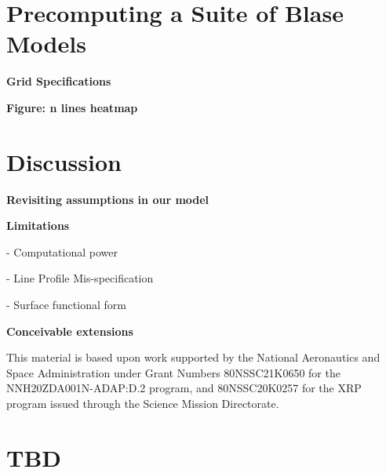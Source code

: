 \documentclass[twocolumn]{aastex631}
\begin{document}
\section{Precomputing a Suite of Blase Models}
\begin{mdframed}
    \textbf{Grid Specifications} \par
    \textcolor{lightgray}{\lipsum[5]}
\end{mdframed}

\begin{mdframed}
    \textbf{Figure: n lines heatmap} \par
\end{mdframed}

\section{Discussion}\label{sec:intro}
\begin{mdframed}
    \textbf{Revisiting assumptions in our model} \par
    \textcolor{lightgray}{\lipsum[5]}
\end{mdframed}

\begin{mdframed}
    \textbf{Limitations} \par
    - Computational power \par
    - Line Profile Mis-specification \par
    - Surface functional form \par
    \textcolor{lightgray}{\lipsum[14]}
\end{mdframed}


\begin{mdframed}
    \textbf{Conceivable extensions} \par
    \textcolor{lightgray}{\lipsum[16]}
\end{mdframed}


\pagebreak
\newpage

\begin{acknowledgments}
    This material is based upon work supported by the National Aeronautics and Space Administration under Grant Numbers 80NSSC21K0650 for the NNH20ZDA001N-ADAP:D.2 program,
    and 80NSSC20K0257 for the XRP program issued through the Science Mission Directorate.
\end{acknowledgments}








\clearpage

\appendix
\restartappendixnumbering

\section{TBD} \label{appendixLogScale}
\end{document}

